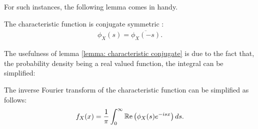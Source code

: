 For such instances, the following lemma comes in handy.
\begin{lemma}\label{lemma: characteristic conjugate}
	The characteristic function is conjugate symmetric \citep{kleppe2006numerical}:
	\begin{align}
	\phi_X(s) = \overline{\phi_X(-s)}.
	\end{align}
\end{lemma}
The usefulness of lemma \ref{lemma: characteristic conjugate} is due to the fact that, the probability density being a real valued function, the integral can be simplified:
\begin{theorem}\label{theorem: IFT simplified}
	The inverse Fourier transform of the characteristic function can be simplified as follows:
	\begin{align}
	f_X(x)=\frac{1}{\pi}\int_0^\infty \operatorname{\mathbb{R}e} \left(\phi_X(s)e^{-isx}\right) ds.
	\end{align}
\end{theorem}
